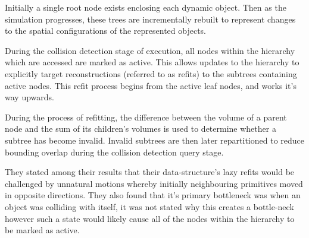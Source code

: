       Initially a single root node exists enclosing each dynamic object. Then as the simulation progresses, these trees are incrementally rebuilt to represent changes to the spatial configurations of the represented objects.
      
      During the collision detection stage of execution, all nodes within the hierarchy which are accessed are marked as active. This allows updates to the hierarchy to explicitly target reconstructions (referred to as refits) to the subtrees containing active nodes. This refit process begins from the active leaf nodes, and works it's way upwards.
      
      During the process of refitting, the difference between the volume of a parent node and the sum of its children's volumes is used to determine whether a subtree has become invalid. Invalid subtrees are then later repartitioned to reduce bounding overlap during the collision detection query stage.
      
      They stated among their results that their data-structure's lazy refits would be challenged by unnatural motions whereby initially neighbouring primitives moved in opposite directions. They also found that it's primary bottleneck was when an object was colliding with itself, it was not stated why this creates a bottle-neck however such a state would likely cause all of the nodes within the hierarchy to be marked as active.
      
